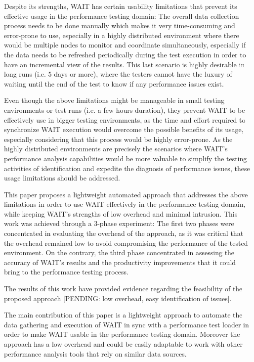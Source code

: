 \documentclass[runningheads,a4paper]{llncs}
\begin{document}
Despite its strengths, WAIT has certain usability limitations that prevent its
effective usage in the performance testing domain: The overall data collection
process needs to be done manually which makes it very time-consuming and
error-prone to use, especially in a highly distributed environment where there
would be multiple nodes to monitor and coordinate simultaneously, especially
if the data needs to be refreshed periodically during the test execution in
order to have an incremental view of the results. This last scenario is highly
desirable in long runs (i.e. 5 days or more), where the testers cannot have the
luxury of waiting until the end of the test to know if any performance issues
exist. 

Even though the above limitations might be manageable in small testing
environments or test runs (i.e. a few hours duration), they prevent WAIT to be
effectively use in bigger testing environments, as the time and effort
required to synchronize WAIT execution would overcome the possible benefits of
its usage, especially considering that this process would be highly error-prone.
As the highly distributed environments are precisely the scenarios where WAIT's
performance analysis capabilities would be more valuable to simplify the testing 
activities of identification and expedite the diagnosis of performance issues,
these usage limitations should be addressed. 

This paper proposes a lightweight automated approach that addresses the above
limitations in order to use WAIT effectively in the performance testing domain, 
while keeping WAIT's strengths of low overhead and minimal intrusion. This work
was achieved through a 3-phase experiment: The first two phases were concentrated 
in evaluating the overhead of the approach, as it was critical that the overhead remained low to avoid
compromising the performance of the tested environment. On the contrary, the third 
phase concentrated in assessing the accuracy of WAIT's results and the productivity 
improvements that it could bring to the performance testing process. 

The results of this work have provided evidence regarding the feasibility of the
proposed approach [PENDING: low overhead, easy identification of issues].

The main contribution of this paper is a lightweight approach to automate the data 
gathering and execution of WAIT in sync with a performance test loader in
order to make WAIT usable in the performance testing domain. Moreover the
approach has a low overhead and could be easily adaptable to work with other
performance analysis tools that rely on similar data sources.
\end{document}
